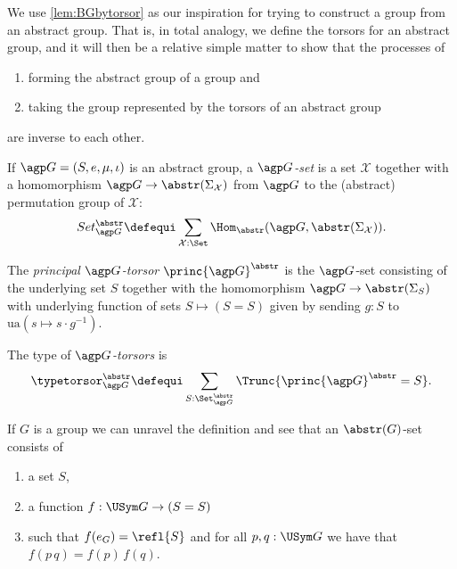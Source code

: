 We use \cref{lem:BGbytorsor} as our inspiration for trying to construct a group from an abstract group.
That is, in total analogy, we define the torsors for an abstract group,
and it will then be a relative simple matter to show that the processes of
\begin{enumerate}
\item forming the abstract group of a group and
\item taking the group represented by the torsors of an abstract group
\end{enumerate}
 are inverse to each other.
\begin{definition}
\label{def:abstrGtorsors}
  If ${\agp G}=(S,e,\mu,\iota)$ is an abstract group, a \emph{$\agp G$-set} is a set $\mathcal X$ together with a homomorphism
$\agp G\to\abstr(\Sigma_{\mathcal X})$
from $\agp G$ to the (abstract) permutation group of $\mathcal X$:
$$Set_{\agp G}^\abstr\defequi \sum_{\mathcal X:\Set}\Hom_\abstr({\agp G},\abstr(\Sigma_{\mathcal X})).$$

The \emph{principal ${\agp G}$-torsor} $\princ {\agp G}^\abstr$ is the ${\agp G}$-set consisting of the underlying set $S$ together with the homomorphism ${\agp G}\to\abstr(\Sigma_{S})$ with underlying function of sets $S\mapsto (S=S)$ given by sending $g:S$ to $\mathrm{ua}(s\mapsto s\cdot g^{-1})$.

The type of \emph{${\agp G}$-torsors} is
$$\typetorsor_{\agp G}^\abstr\defequi\sum_{S:\Set_{\agp G}^\abstr}\Trunc{\princ {\agp G}^\abstr=S}.$$
\end{definition}
\begin{example}
  If $G$ is a group we can unravel the definition and see that an $\abstr(G)$-set consists of
  \begin{enumerate}
  \item a set $S$,
  \item a function $f:\USym G\to (S=S)$
  \item such that $f(e_G)=\refl{S}$ and for all $p,q:\USym G$ we have that $f(p\, q)=f(p)\,f(q)$.
  \end{enumerate}

\end{example}


